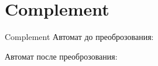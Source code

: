 \section{Complement}
\begin{frame}{Complement}
	Автомат до преоброзования:


	Автомат после преоброзования:


\end{frame}
